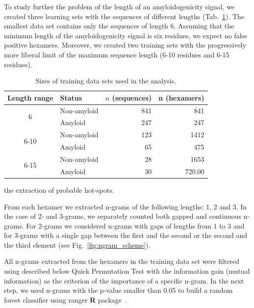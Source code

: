 \documentclass[a4,center,fleqn]{NAR}
\begin{document}
  To study further the problem of the length of an amyloidogenicity signal, we 
created three learning sets with the sequences of different lengths 
(Tab.~\ref{tab:training_sets}). The smallest data set contains only the 
sequences of length 6. Assuming that the minimum length of the amyloidogenicity 
signal is six residues, we expect no false positive hexamers. Moreover, we 
created two training sets with the progressively more liberal limit of the 
maximum sequence length (6-10 residues and 6-15 residues).

\begin{table}[]
\centering
\caption{Sizes of training data sets used in the analysis.}
\label{tab:training_sets}
\begin{tabular}{clrr}
\hline
Length range & Status & $n$ (sequences) & n (hexamers) \\ \hline
\multirow{2}{*}{6} & Non-amyloid & 841 & 841 \\
 & Amyloid & 247 & 247 \\
\hline
\multirow{2}{*}{6-10} & Non-amyloid & 123 & 1412 \\
 & Amyloid & 65 & 475 \\
\hline
\multirow{2}{*}{6-15} & Non-amyloid & 28 & 1653 \\
 & Amyloid & 30 & 720.00 \\
\hline
\end{tabular}
\end{table}

%
%
%
the extraction of probable hot-spots.

  From each hexamer we extracted n-grams of the following lengths: 1, 2 and 3. In 
the case of 2- and 3-grams, we separately counted both gapped and continuous 
n-grams. For 2-grams we considered n-grams with gaps of lengths from 1 to 3 and for 
%
%
%
3-grams with a single gap between the first and the second or the second and the 
third element (see Fig.~\ref{fig:ngram_scheme}).

  All n-grams extracted from the hexamers in the training data set were filtered 
using described below Quick Permutation Test with the information gain (mutual 
information) as the criterion of the importance of a specific n-gram. In the 
next step, we used n-grams with the p-value smaller than 0.05 to build a random 
forest classifier using ranger \textbf{R} package~\citep{wright_ranger:_2015}. 
\end{document}
